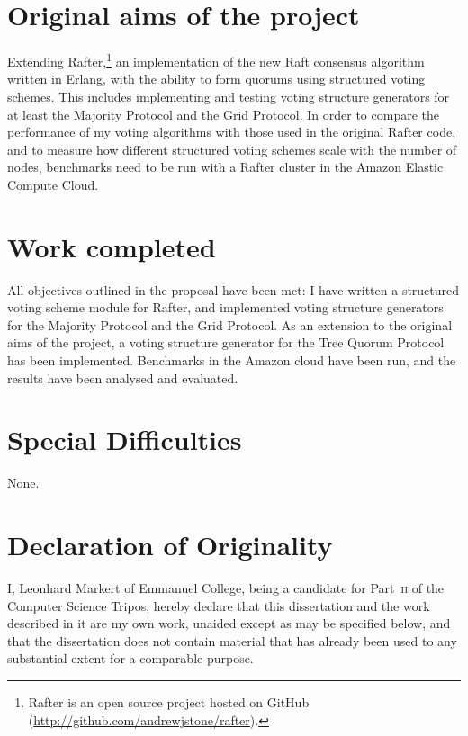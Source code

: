 \documentclass[12pt,chapterprefix=true,toc=bibliography,numbers=noendperiod,
               footnotes=multiple,twoside]{scrreprt}
\begin{document}
\section*{Original aims of the project}
\label{sc:original-aims}

Extending Rafter,\footnote{Rafter is an open source project hosted on GitHub (\url{http://github.com/andrewjstone/rafter}).} an implementation of the new Raft consensus algorithm \autocite{raft} written in Erlang, with the ability to form quorums using structured voting schemes. This includes implementing and testing voting structure generators for at least the Majority Protocol and the Grid Protocol. In order to compare the performance of my voting algorithms with those used in the original Rafter code, and to measure how different structured voting schemes scale with the number of nodes, benchmarks need to be run with a Rafter cluster in the Amazon Elastic Compute Cloud.

\section*{Work completed}
\label{sc:work-completed}

All objectives outlined in the proposal have been met: I have written a structured voting scheme module for Rafter, and implemented voting structure generators for the Majority Protocol and the Grid Protocol. As an extension to the original aims of the project, a voting structure generator for the Tree Quorum Protocol has been implemented. Benchmarks in the Amazon cloud have been run, and the results have been analysed and evaluated.

\section*{Special Difficulties}
\label{sc:special-difficulties}

None.

\newpage

\section*{Declaration of Originality}
\label{sc:declaration-of-originality}

I, Leonhard Markert of Emmanuel College, being a candidate for Part~\textsc{ii} of the Computer Science Tripos, hereby declare that this dissertation and the work described in it are my own work, unaided except as may be specified below, and that the dissertation does not contain material that has already been used to any substantial extent for a comparable purpose.
\end{document}
